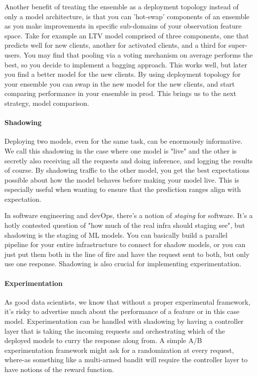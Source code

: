 Another benefit of treating the ensemble as a deployment topology instead of only a model architecture, is that you can 'hot-swap' components of an ensemble as you make improvements in specific sub-domains of your observation feature space. Take for example an LTV model comprised of three components, one that predicts well for new clients, another for activated clients, and a third for super-users. You may find that pooling via a voting mechanism on average performs the best, so you decide to implement a bagging approach. This works well, but later you find a better model for the new clients. By using deployment topology for your ensemble you can swap in the new model for the new clients, and start comparing performance in your ensemble in prod. This brings us to the next strategy, model comparison.

\paragraph{Shadowing}

Deploying two models, even for the same task, can be enormously informative. We call this shadowing in the case where one model is "live" and the other is secretly also receiving all the requests and doing inference, and logging the results of course. By shadowing traffic to the other model, you get the best expectations possible about how the model behaves before making your model live. This is especially useful when wanting to ensure that the prediction ranges align with expectation. 

In software engineering and devOps, there's a notion of \emph{staging} for software. It's a hotly contested question of "how much of the real infra should staging see", but shadowing is the staging of ML models. You can basically build a parallel pipeline for your entire infrastructure to connect for shadow models, or you can just put them both in the line of fire and have the request sent to both, but only use one response. Shadowing is also crucial for implementing experimentation.

\paragraph{Experimentation}

As good data scientists, we know that without a proper experimental framework, it's risky to advertise much about the performance of a feature or in this case model. Experimentation can be handled with shadowing by having a controller layer that is taking the incoming requests and orchestrating which of the deployed models to curry the response along from. A simple A/B experimentation framework might ask for a randomization at every request, where-as something like a multi-armed bandit will require the controller layer to have notions of the reward function.

